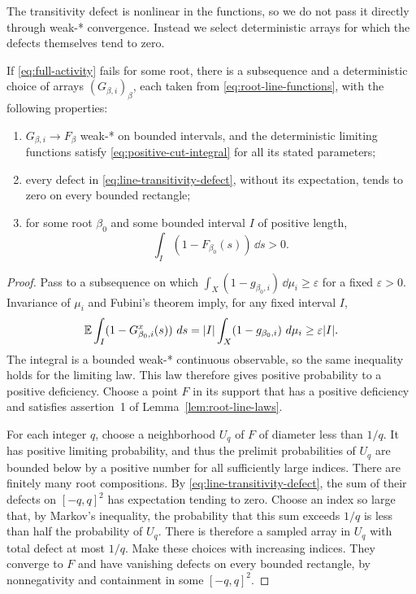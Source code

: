 The transitivity defect is nonlinear in the functions, so we do not pass
it directly through weak-* convergence.  Instead we select deterministic
arrays for which the defects themselves tend to zero.

\begin{lemma}\label{lem:deterministic-root-arrays}
If \eqref{eq:full-activity} fails for some root, there is a subsequence
and a deterministic choice of arrays $(G_{\beta,i})_\beta$, each taken
from \eqref{eq:root-line-functions}, with the following properties:
\begin{enumerate}
 \item $G_{\beta,i}\to F_\beta$ weak-* on bounded intervals, and the
 deterministic limiting functions satisfy
 \eqref{eq:positive-cut-integral} for all its stated parameters;
 \item every defect in \eqref{eq:line-transitivity-defect}, without its
 expectation, tends to zero on every bounded rectangle;
 \item for some root $\beta_0$ and some bounded interval $I$ of positive
 length,
 \begin{equation}\label{eq:limiting-deficiency}
  \int_I(1-F_{\beta_0}(s))\,\dd s>0.
 \end{equation}
\end{enumerate}
\end{lemma}

\begin{proof}
Pass to a subsequence on which
$\int_X(1-g_{\beta_0,i})\,\dd\mu_i\geq\varepsilon$ for a fixed
$\varepsilon>0$.  Invariance of $\mu_i$ and Fubini's theorem imply, for
any fixed interval $I$,
\[
 \mathbb E\int_I(1-G_{\beta_0,i}^{x}(s))\,\mathop{}\!d s
 =|I|\int_X(1-g_{\beta_0,i})\,\mathop{}\!d\mu_i
 \geq\varepsilon|I|.
\]
The integral is a bounded weak-* continuous observable, so the same
inequality holds for the limiting law.  This law therefore gives positive
probability to a positive deficiency.  Choose a point $F$ in its support
that has a positive deficiency and satisfies assertion~1 of
Lemma~\ref{lem:root-line-laws}.

For each integer $q$, choose a neighborhood $U_q$ of $F$ of diameter
less than $1/q$.  It has positive limiting probability, and thus the
prelimit probabilities of $U_q$ are bounded below by a positive number
for all sufficiently large indices.  There are finitely many root
compositions.  By \eqref{eq:line-transitivity-defect}, the sum of their
defects on $[-q,q]^2$ has expectation tending to zero.  Choose an index
so large that, by Markov's inequality, the probability that this sum
exceeds $1/q$ is less than half the probability of $U_q$.  There is
therefore a sampled array in $U_q$ with total defect at most $1/q$.
Make these choices with increasing indices.  They converge to $F$ and
have vanishing defects on every bounded rectangle, by nonnegativity
and containment in some $[-q,q]^2$.
\end{proof}

